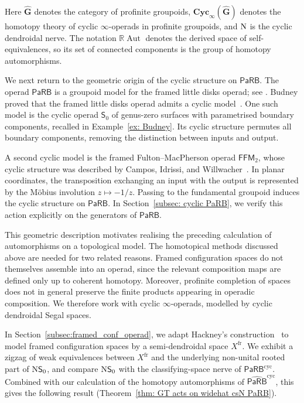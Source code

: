 \documentclass{amsart}
\newcommand{\Grpd}{\mathbf{G}}
\newcommand{\PaRB}{\mathsf{PaRB}}
\newcommand{\Cyc}{\mathbf{Cyc}}
\newcommand{\Aut}{\operatorname{Aut}}
\newcommand{\nerve}{\textnormal{N}}
\theoremstyle{definition}
\numberwithin{equation}{section}
\begin{document}
Here $\widehat{\Grpd}$ denotes the category of profinite groupoids,
$\Cyc_\infty(\widehat{\Grpd})$ denotes the homotopy theory of cyclic
$\infty$-operads in profinite groupoids, and $\nerve$ is the cyclic
dendroidal nerve. The notation $\mathbb R\Aut$ denotes the derived
space of self-equivalences, so its set of connected components is the
group of homotopy automorphisms.

We next return to the geometric origin of the cyclic structure on
$\PaRB$. The operad $\PaRB$ is a groupoid model for the framed little
disks operad; see \cite[Chapter~1]{Wahl_Thesis}. Budney proved that
the framed little disks operad admits a cyclic
model~\cite{Budney}. One such model is the cyclic operad
$\mathsf S_0$ of genus-zero surfaces with parametrised boundary
components, recalled in Example~\ref{ex: Budney}. Its cyclic
structure permutes all boundary components, removing the distinction
between inputs and output.

A second cyclic model is the framed Fulton--MacPherson operad
$\mathsf{FFM}_2$, whose cyclic structure was described by Campos,
Idrissi, and Willwacher~\cite{campos2019configuration}. In planar
coordinates, the transposition exchanging an input with the output
is represented by the Möbius involution $z\mapsto-1/z$. Passing to
the fundamental groupoid induces the cyclic structure on $\PaRB$.
In Section~\ref{subsec: cyclic PaRB}, we verify this action explicitly
on the generators of $\PaRB$.

This geometric description motivates realising the preceding
calculation of automorphisms on a topological model. The homotopical
methods discussed above are needed for two related reasons. Framed
configuration spaces do not themselves assemble into an operad,
since the relevant composition maps are defined only up to coherent
homotopy. Moreover, profinite completion of spaces does not in
general preserve the finite products appearing in operadic
composition. We therefore work with cyclic $\infty$-operads,
modelled by cyclic dendroidal Segal spaces.

In Section~\ref{subsec:framed_conf_operad}, we adapt Hackney's
construction~\cite{hackney_config} to model framed configuration
spaces by a semi-dendroidal space $X^{\mathrm{fr}}$. We exhibit a
zigzag of weak equivalences between $X^{\mathrm{fr}}$ and the
underlying non-unital rooted part of $\nerve\mathsf S_0$, and compare
$\nerve\mathsf S_0$ with the classifying-space nerve of
$\PaRB^{\mathrm{cyc}}$. Combined with our calculation of the homotopy
automorphisms of $\widehat{\PaRB}^{\mathrm{cyc}}$, this gives the
following result
(Theorem~\ref{thm: GT acts on widehat csN PaRB}).
\end{document}
